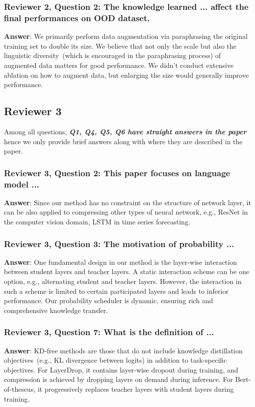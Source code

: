 \documentclass{article}
\begin{document}
\subsubsection*{Reviewer 2, Question 2: The knowledge learned ... affect the final performances on OOD dataset.} 
\textbf{Answer}: We primarily perform data augmentation via paraphrasing the original training set to double its size. We believe that not only the scale but also the linguistic diversity~(which is encouraged in the paraphrasing process) of augmented data matters for good performance. We didn't conduct extensive ablation on how to augment data, but enlarging the size would generally improve performance. 


\subsection*{Reviewer 3}
Among all questions, \textit{\textbf{Q1, Q4, Q5, Q6 have straight answers in the paper}} hence we only provide brief answers along with where they are described in the paper.
\subsubsection*{Reviewer 3, Question 2: This paper focuses on language model ...}
\textbf{Answer}: Since our method has no constraint on the structure of network layer, it can be also applied to compressing other types of neural network, e.g., ResNet in the computer vision domain, LSTM in time series forecasting.
\noindent
\subsubsection*{Reviewer 3, Question 3: The motivation of probability ...}
\textbf{Answer}: One fundamental design in our method is the layer-wise interaction between student layers and teacher layers. A static interaction scheme can be one option, e.g., alternating student and teacher layers. However, the interaction in such a scheme is limited to certain participated layers and leads to inferior performance. Our probability scheduler is dynamic, ensuring rich and comprehensive knowledge transfer.
\subsubsection*{Reviewer 3, Question 7: What is the definition of ...}
\textbf{Answer}: KD-free methods are those that do not include knowledge distillation objectives~(e.g., KL divergence between logits) in addition to task-specific objectives. For LayerDrop, it contains layer-wise dropout during training, and compression is achieved by dropping layers on demand during inference. For Bert-of-theseus, it progressively replaces teacher layers with student layers during training.
\end{document}
